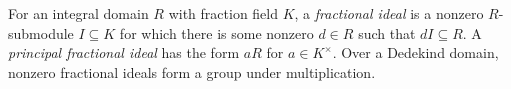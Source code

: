 
For an integral domain $R$ with fraction field $K$, a \emph{fractional ideal} is a nonzero $R$-submodule $I\subseteq K$ for which there is some nonzero $d\in R$ such that $dI\subseteq R$. A \emph{principal fractional ideal} has the form $aR$ for $a\in K^\times$. Over a Dedekind domain, nonzero fractional ideals form a group under multiplication.
